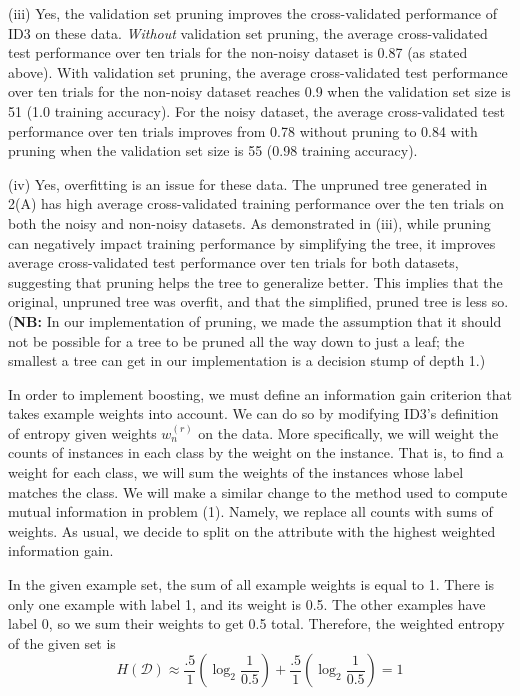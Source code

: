 \documentclass[solution, letterpaper]{cs121}
\begin{document}
(iii) Yes, the validation set pruning improves the cross-validated performance of ID3 on these data. \emph{Without} validation set pruning, the average cross-validated test performance over ten trials for the non-noisy dataset is 0.87 (as stated above). With validation set pruning, the average cross-validated test performance over ten trials for the non-noisy dataset reaches 0.9 when the validation set size is 51 (1.0 training accuracy). For the noisy dataset, the average cross-validated test performance over ten trials improves from 0.78 without pruning to 0.84 with pruning when the validation set size is 55 (0.98 training accuracy). \\

\pagebreak

(iv) Yes, overfitting is an issue for these data. The unpruned tree generated in 2(A) has high average cross-validated training performance over the ten trials on both the noisy and non-noisy datasets. As demonstrated in (iii), while pruning can negatively impact training performance by simplifying the tree, it improves average cross-validated test performance over ten trials for both datasets, suggesting that pruning helps the tree to generalize better. This implies that the original, unpruned tree was overfit, and that the simplified, pruned tree is less so. ({\bf NB:} In our implementation of pruning, we made the assumption that it should not be possible for a tree to be pruned all the way down to just a leaf; the smallest a tree can get in our implementation is a decision stump of depth 1.)

\subproblem In order to implement boosting, we must define an information gain criterion that takes example weights into account. We can do so by modifying ID3's definition of entropy given weights $w_n^{(r)}$ on the data. More specifically, we will weight the counts of instances in each class by the weight on the instance. That is, to find a weight for each class, we will sum the weights of the instances whose label matches the class. We will make a similar change to the method used to compute mutual information in problem (1). Namely, we replace all counts with sums of weights. As usual, we decide to split on the attribute with the highest weighted information gain.

In the given example set, the sum of all example weights is equal to 1. There is only one example with label 1, and its weight is 0.5. The other examples have label 0, so we sum their weights to get 0.5 total. Therefore, the weighted entropy of the given set is
\[ H(\mathcal D) \approx \frac{.5}{1} (\log_2 \frac{1}{0.5}) + \frac{.5}{1} (\log_2 \frac{1}{0.5}) = 1 \]
\end{document}
